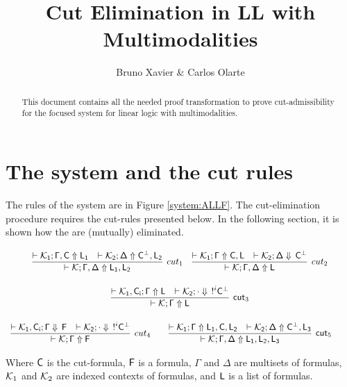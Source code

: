 \documentclass[12pt]{article}
\begin{document}
 
\title{
    {\large \textbf{Cut Elimination in LL with Multimodalities}}}%
\author{Bruno Xavier \& Carlos Olarte}
 
\maketitle

\begin{abstract}
    This document contains all the needed proof transformation to prove
    cut-admissibility for the focused system for linear logic with multimodalities.
\end{abstract}
\section{The system and the cut rules}
The rules of the system are in Figure \ref{system:ALLF}.
The cut-elimination procedure requires the cut-rules
presented below. In the following section, it is shown how
the are (mutually) eliminated. 


 
  	\begin{center}
 		$
 		\begin{array}{ccc ccc}
 			
 			\infer[cut_1]{\unfoc{\Kcal}{\Gamma,\Delta}{L_1,L_2}}{
 				\deduce{\unfoc{\Kcal_1}{\Gamma,\cutF}{L_1}}{}
 				&
 				\deduce{\unfoc{\Kcal_2}{\Delta}{\cutF^\perp,L_2}}{}
 			}
 			\quad
 			\infer[cut_2]{\unfoc{\Kcal}{\Gamma,\Delta}{L}}{
 				\deduce{\unfoc{\Kcal_1}{\Gamma}{\cutF,L}}{}
 				&
 				\deduce{\foc{\Kcal_2}{\Delta}{\cutF^\perp}}{}
 			}
 			\\\\
 			\infer[\cut_3]{\unfoc{\Kcal}{\Gamma}{L}}{
 				\deduce{\unfoc{\Kcal_1,\cutF_i}{\Gamma}{L}}{}
 				&
 				\deduce{\foc{\Kcal_2}{\cdot}{\nbang{i}\cutF^\perp}}{}
 			}
 			\\\\
 			\infer[cut_4]{\unfoc{\Kcal}{\Gamma}{F}}{
 				\deduce{\foc{\Kcal_1,\cutF_i}{\Gamma}{F}}{}
 				&
 				\deduce{\foc{\Kcal_2}{\cdot}{\nbang{i} \cutF^\perp}}{}
 			}
 			\qquad
 			\infer[\cut_5]{\unfoc{\Kcal}{\Gamma,\Delta}{L_1,L_2,L_3}}{
 				\deduce{\unfoc{\Kcal_1}{\Gamma}{L_1,\cutF,L_2}}{}
 				&
 				\deduce{\unfoc{\Kcal_2}{\Delta}{\cutF^\perp,L_3}}{}
 			}
 			\qquad
 		\end{array}$
 		
 	\end{center}		
 	
 	Where $\mathsf{C}$ is the cut-formula, $\mathsf{F}$ is a formula, $\Gamma$ and $\Delta$ are multisets of formulas, $\mathcal{K}_1$ and $\mathcal{K}_2$ are indexed contexts of formulas, and $\mathsf{L}$ is a list of formulas. 
 
\end{document}
